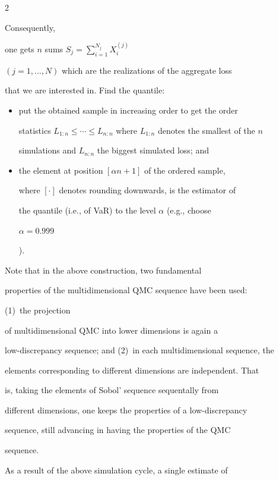\begin{multicols}{2}
\begin{enumerate}[I.]
Consequently,

one gets $n$ sums $S_j = \sum\limits_{i=1}^{N_{j}}X^{(j)}_i$\,

$(j=1,\dots,N)$ which are the realizations of the aggregate loss

that we are interested in. Find the quantile:

\begin{itemize}

\item

put the obtained sample in increasing order to get the order

statistics $L_{1:n}

 \le \cdots \le L_{n:n}$ where $L_{1:n}$ denotes the smallest of the $n$

 simulations and $L_{n:n}$ the biggest simulated loss; and

\item

the element at position $[\alpha n+1]$ of the ordered sample,

where $[\cdot]$ denotes rounding downwards, is the estimator of

the quantile (i.e., of VaR) to the level $\alpha$ (e.g., choose {\bf

$\alpha=0.999$}).

\end{itemize}

\end{enumerate}



Note that in the above construction, two fundamental

properties of the multidimensional QMC sequence have been used:

(1)~the projection

of multidimensional QMC into lower dimensions is again a

low-discrepancy sequence; and (2)~in each multidimensional sequence, the

elements corresponding to different dimensions are independent. That

is, taking the elements of Sobol' sequence sequentally from

different dimensions, one keeps the properties of a low-discrepancy

sequence, still advancing in having the properties of the QMC

sequence.



As a result of the above simulation cycle, a single estimate of


\end{multicols}
